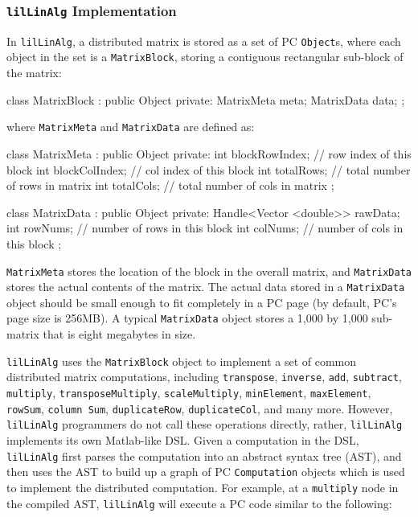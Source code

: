 \subsubsection{\texttt{lilLinAlg} Implementation}

In \texttt{lilLinAlg}, a distributed matrix is stored as a set of PC \texttt{Object}s, where each 
object in the set is a \texttt{MatrixBlock}, storing a contiguous rectangular sub-block of the matrix:

\begin{codesmall}
class MatrixBlock : public Object {
private:
    MatrixMeta meta;
    MatrixData data;
};
\end{codesmall}

\noindent where \texttt{MatrixMeta} and \texttt{MatrixData} are defined as:

\begin{codesmall}
class MatrixMeta : public Object {
private:
    int blockRowIndex; // row index of this block
    int blockColIndex; // col index of this block
    int totalRows; // total number of rows in matrix 
    int totalCols; // total number of cols in matrix
};

class MatrixData : public Object {
private:
    Handle<Vector <double>> rawData;
    int rowNums; // number of rows in this block
    int colNums; // number of cols in this block
};
\end{codesmall}

\noindent \texttt{MatrixMeta} stores the location of the block in the overall matrix, and
\texttt{MatrixData} stores the actual contents of the matrix.
The actual data stored in a \texttt{MatrixData} object should be small enough to fit completely in 
a PC page (by default, PC's page size is 256MB).  A typical \texttt{MatrixData} object stores a
1,000 by 1,000 sub-matrix that is eight megabytes in size.

\texttt{lilLinAlg} uses the \texttt{MatrixBlock} object to implement a set of common distributed matrix
computations, including \texttt{transpose},
\texttt{inverse}, \texttt{add}, \texttt{subtract}, \texttt{multiply}, \texttt{transposeMultiply}, 
\texttt{scaleMultiply}, \texttt{minElement},
\texttt{maxElement}, \texttt{rowSum}, \texttt{column Sum}, \texttt{duplicateRow}, \texttt{duplicateCol}, 
and many more.  However, \texttt{lilLinAlg} programmers do not call these operations directly, rather,
\texttt{lilLinAlg} implements its own Matlab-like DSL.  
Given a computation in the DSL, \texttt{lilLinAlg} first parses the computation into an abstract syntax tree (AST), and then
uses the AST to build up a graph of PC \texttt{Computation} objects which is used to implement the distributed computation.
For example, at a \texttt{multiply} node in the compiled AST, \texttt{lilLinAlg} 
will execute a PC code similar to the following:

